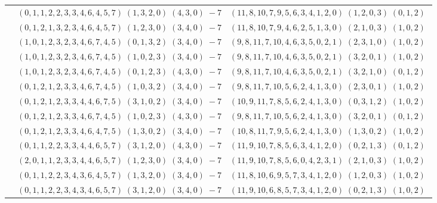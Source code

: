 \documentclass[11pt]{article}
\begin{document}
\begin{longtable}[l]{|c|c|c|}
 \cline{2-3} 
 & $(0 ,1 ,1 ,2 ,2 ,3 ,3 ,4 ,6 ,4 ,5 ,7) \;(1 ,3 ,2 ,0) \;(4 ,3 ,0) \;-7$ & $(11 ,8 ,10 ,7 ,9 ,5 ,6 ,3 ,4 ,1 ,2 ,0) \;(1 ,2 ,0 ,3) \;(0 ,1 ,2) \;$\\ 
 \cline{2-3} 
 & $(0 ,1 ,2 ,1 ,3 ,2 ,3 ,4 ,6 ,4 ,5 ,7) \;(1 ,2 ,3 ,0) \;(3 ,4 ,0) \;-7$ & $(11 ,8 ,10 ,7 ,9 ,4 ,6 ,2 ,5 ,1 ,3 ,0) \;(2 ,1 ,0 ,3) \;(1 ,0 ,2) \;$\\ 
 \cline{2-3} 
 & $(1 ,0 ,1 ,2 ,3 ,2 ,3 ,4 ,6 ,7 ,4 ,5) \;(0 ,1 ,3 ,2) \;(3 ,4 ,0) \;-7$ & $(9 ,8 ,11 ,7 ,10 ,4 ,6 ,3 ,5 ,0 ,2 ,1) \;(2 ,3 ,1 ,0) \;(1 ,0 ,2) \;$\\ 
 \cline{2-3} 
 & $(1 ,0 ,1 ,2 ,3 ,2 ,3 ,4 ,6 ,7 ,4 ,5) \;(1 ,0 ,2 ,3) \;(3 ,4 ,0) \;-7$ & $(9 ,8 ,11 ,7 ,10 ,4 ,6 ,3 ,5 ,0 ,2 ,1) \;(3 ,2 ,0 ,1) \;(1 ,0 ,2) \;$\\ 
 \cline{2-3} 
 & $(1 ,0 ,1 ,2 ,3 ,2 ,3 ,4 ,6 ,7 ,4 ,5) \;(0 ,1 ,2 ,3) \;(4 ,3 ,0) \;-7$ & $(9 ,8 ,11 ,7 ,10 ,4 ,6 ,3 ,5 ,0 ,2 ,1) \;(3 ,2 ,1 ,0) \;(0 ,1 ,2) \;$\\ 
 \cline{2-3} 
 & $(0 ,1 ,2 ,1 ,2 ,3 ,3 ,4 ,6 ,7 ,4 ,5) \;(1 ,0 ,3 ,2) \;(3 ,4 ,0) \;-7$ & $(9 ,8 ,11 ,7 ,10 ,5 ,6 ,2 ,4 ,1 ,3 ,0) \;(2 ,3 ,0 ,1) \;(1 ,0 ,2) \;$\\ 
 \cline{2-3} 
 & $(0 ,1 ,2 ,1 ,2 ,3 ,3 ,4 ,4 ,6 ,7 ,5) \;(3 ,1 ,0 ,2) \;(3 ,4 ,0) \;-7$ & $(10 ,9 ,11 ,7 ,8 ,5 ,6 ,2 ,4 ,1 ,3 ,0) \;(0 ,3 ,1 ,2) \;(1 ,0 ,2) \;$\\ 
 \cline{2-3} 
 & $(0 ,1 ,2 ,1 ,2 ,3 ,3 ,4 ,6 ,7 ,4 ,5) \;(1 ,0 ,2 ,3) \;(4 ,3 ,0) \;-7$ & $(9 ,8 ,11 ,7 ,10 ,5 ,6 ,2 ,4 ,1 ,3 ,0) \;(3 ,2 ,0 ,1) \;(0 ,1 ,2) \;$\\ 
 \cline{2-3} 
 & $(0 ,1 ,2 ,1 ,2 ,3 ,3 ,4 ,6 ,4 ,7 ,5) \;(1 ,3 ,0 ,2) \;(3 ,4 ,0) \;-7$ & $(10 ,8 ,11 ,7 ,9 ,5 ,6 ,2 ,4 ,1 ,3 ,0) \;(1 ,3 ,0 ,2) \;(1 ,0 ,2) \;$\\ 
 \cline{2-3} 
 & $(0 ,1 ,1 ,2 ,2 ,3 ,3 ,4 ,4 ,6 ,5 ,7) \;(3 ,1 ,2 ,0) \;(4 ,3 ,0) \;-7$ & $(11 ,9 ,10 ,7 ,8 ,5 ,6 ,3 ,4 ,1 ,2 ,0) \;(0 ,2 ,1 ,3) \;(0 ,1 ,2) \;$\\ 
 \cline{2-3} 
 & $(2 ,0 ,1 ,1 ,2 ,3 ,3 ,4 ,4 ,6 ,5 ,7) \;(1 ,2 ,3 ,0) \;(3 ,4 ,0) \;-7$ & $(11 ,9 ,10 ,7 ,8 ,5 ,6 ,0 ,4 ,2 ,3 ,1) \;(2 ,1 ,0 ,3) \;(1 ,0 ,2) \;$\\ 
 \cline{2-3} 
 & $(0 ,1 ,1 ,2 ,2 ,3 ,4 ,3 ,6 ,4 ,5 ,7) \;(1 ,3 ,2 ,0) \;(3 ,4 ,0) \;-7$ & $(11 ,8 ,10 ,6 ,9 ,5 ,7 ,3 ,4 ,1 ,2 ,0) \;(1 ,2 ,0 ,3) \;(1 ,0 ,2) \;$\\ 
 \cline{2-3} 
 & $(0 ,1 ,1 ,2 ,2 ,3 ,4 ,3 ,4 ,6 ,5 ,7) \;(3 ,1 ,2 ,0) \;(3 ,4 ,0) \;-7$ & $(11 ,9 ,10 ,6 ,8 ,5 ,7 ,3 ,4 ,1 ,2 ,0) \;(0 ,2 ,1 ,3) \;(1 ,0 ,2) \;$\\ 

\end{longtable}
\end{document}
